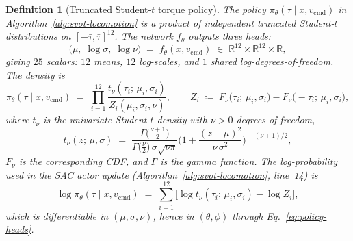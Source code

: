 \documentclass[11pt,a4paper]{article}
\newtheorem{definition}[theorem]{Definition}
\newcommand{\R}{\mathbb{R}}
\begin{document}
\begin{definition}[Truncated Student-$t$ torque policy]
\label{def:student-t-policy}
The policy
$\pi_\theta(\tau \mid x, v_{\mathrm{cmd}})$
in Algorithm~\ref{alg:svot-locomotion}
is a product of independent truncated
Student-$t$ distributions on
$[-\bar\tau, \bar\tau]^{12}$.
The network $f_\theta$ outputs three heads:
\begin{equation}\label{eq:policy-heads}
  \bigl(\mu,\; \log\sigma,\; \log\nu\bigr)
  \;=\;
  f_\theta(x, v_{\mathrm{cmd}})
  \;\in\;
  \R^{12} \times \R^{12} \times \R,
\end{equation}
giving $25$ scalars:
$12$ means, $12$ log-scales,
and $1$ shared log-degrees-of-freedom.
The density is
\begin{equation}\label{eq:student-t-policy}
  \pi_\theta(\tau \mid x, v_{\mathrm{cmd}})
  \;=\;
  \prod_{i=1}^{12}
  \frac{t_{\nu}(\tau_i;\, \mu_i, \sigma_i)}
       {Z_i(\mu_i, \sigma_i, \nu)},
  \qquad
  Z_i
  \;\coloneqq\;
  F_{\nu}\!\bigl(\bar\tau_i;\, \mu_i, \sigma_i\bigr)
  - F_{\nu}\!\bigl(-\bar\tau_i;\, \mu_i, \sigma_i\bigr),
\end{equation}
where $t_\nu$ is the univariate Student-$t$ density
with $\nu > 0$ degrees of freedom,
\begin{equation}\label{eq:student-t-density}
  t_\nu(z;\, \mu, \sigma)
  \;=\;
  \frac{\Gamma\!\bigl(\tfrac{\nu+1}{2}\bigr)}
       {\Gamma\!\bigl(\tfrac{\nu}{2}\bigr)\,
        \sigma\sqrt{\nu\pi}}
  \biggl(
    1 + \frac{(z - \mu)^2}{\nu\,\sigma^2}
  \biggr)^{\!-(\nu+1)/2}\!,
\end{equation}
$F_\nu$ is the corresponding CDF,
and $\Gamma$ is the gamma function.
The log-probability used in the SAC actor update
(Algorithm~\ref{alg:svot-locomotion}, line~14) is
\begin{equation}\label{eq:log-pi-student}
  \log\pi_\theta(\tau \mid x, v_{\mathrm{cmd}})
  \;=\;
  \sum_{i=1}^{12}
  \biggl[
    \log t_\nu(\tau_i;\, \mu_i, \sigma_i)
    - \log Z_i
  \biggr],
\end{equation}
which is differentiable in $(\mu, \sigma, \nu)$,
hence in $(\theta, \phi)$ through
Eq.~\eqref{eq:policy-heads}.
\end{definition}
\end{document}
